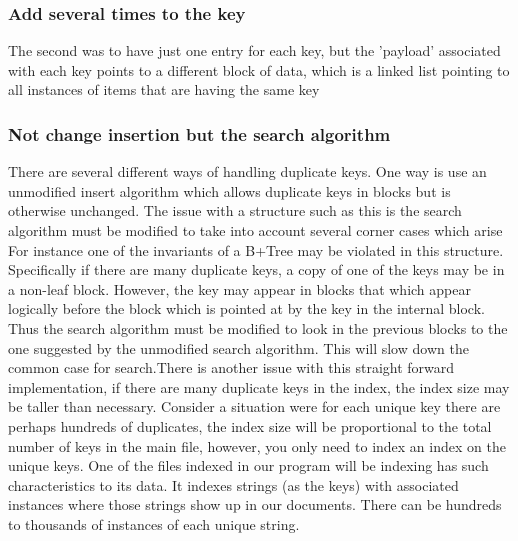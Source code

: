 \documentclass[abstracton,12pt]{scrreprt}
\begin{document}
\subsubsection{Add several times to the key}

The second was to have just one entry for each key, but the 'payload' associated with each key points to a different block of data, which is a linked list pointing to all instances of items that are having the same key


\subsubsection{Not change insertion but the search algorithm}
There are several different ways of handling duplicate keys. One way is use an unmodified insert algorithm which allows duplicate keys in blocks but is otherwise unchanged. The issue with a structure such as this is the search algorithm must be modified to take into account several corner cases which arise
For instance one of the invariants of a B+Tree may be violated in this structure. Specifically if there are many duplicate keys, a copy of one of the keys may be in a non-leaf block. However, the key may appear in blocks that which appear logically before the block which is pointed at by the key in the internal block. Thus the search algorithm must be modified to look in the previous blocks to the one suggested by the unmodified search algorithm. This will slow down the common case for search.There is another issue with this straight forward implementation, if there are many duplicate keys in the index, the index size may be taller than necessary. Consider a situation were for each unique key there are perhaps hundreds of duplicates, the index size will be proportional to the total number of keys in the main file, however, you only need to index an index on the unique keys. One of the files indexed in our program will be indexing has such characteristics to its data. It indexes strings (as the keys) with associated instances where those strings show up in our documents. There can be hundreds to thousands of instances of each unique string.
\end{document}
